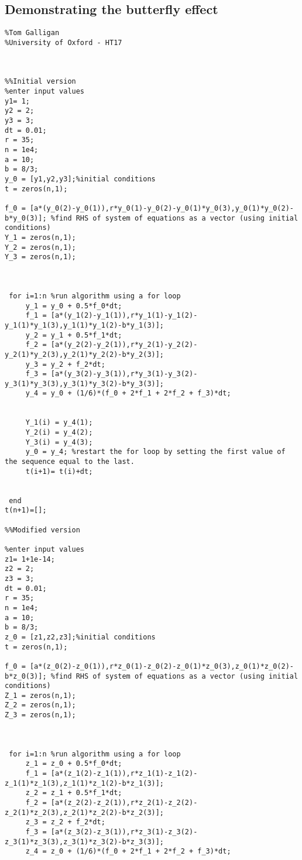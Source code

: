 \documentclass[a4paper,11pt]{article}
\begin{document}
\subsection{Demonstrating the butterfly effect}
\begin{lstlisting}[style=matlab-editor]
%CO24: Chaos - butterfly effect demo
%Tom Galligan
%University of Oxford - HT17



%%Initial version
%enter input values
y1= 1;
y2 = 2;
y3 = 3;
dt = 0.01;
r = 35;
n = 1e4;
a = 10;
b = 8/3;
y_0 = [y1,y2,y3];%initial conditions
t = zeros(n,1);

f_0 = [a*(y_0(2)-y_0(1)),r*y_0(1)-y_0(2)-y_0(1)*y_0(3),y_0(1)*y_0(2)-b*y_0(3)]; %find RHS of system of equations as a vector (using initial conditions)
Y_1 = zeros(n,1);
Y_2 = zeros(n,1);
Y_3 = zeros(n,1);



 for i=1:n %run algorithm using a for loop
     y_1 = y_0 + 0.5*f_0*dt;
     f_1 = [a*(y_1(2)-y_1(1)),r*y_1(1)-y_1(2)-y_1(1)*y_1(3),y_1(1)*y_1(2)-b*y_1(3)];
     y_2 = y_1 + 0.5*f_1*dt;
     f_2 = [a*(y_2(2)-y_2(1)),r*y_2(1)-y_2(2)-y_2(1)*y_2(3),y_2(1)*y_2(2)-b*y_2(3)];
     y_3 = y_2 + f_2*dt;
     f_3 = [a*(y_3(2)-y_3(1)),r*y_3(1)-y_3(2)-y_3(1)*y_3(3),y_3(1)*y_3(2)-b*y_3(3)];
     y_4 = y_0 + (1/6)*(f_0 + 2*f_1 + 2*f_2 + f_3)*dt;
     
     
     Y_1(i) = y_4(1);
     Y_2(i) = y_4(2);
     Y_3(i) = y_4(3);
     y_0 = y_4; %restart the for loop by setting the first value of the sequence equal to the last.
     t(i+1)= t(i)+dt;
     
   
 end
t(n+1)=[];

%%Modified version

%enter input values
z1= 1+1e-14;
z2 = 2;
z3 = 3;
dt = 0.01;
r = 35;
n = 1e4;
a = 10;
b = 8/3;
z_0 = [z1,z2,z3];%initial conditions
t = zeros(n,1);

f_0 = [a*(z_0(2)-z_0(1)),r*z_0(1)-z_0(2)-z_0(1)*z_0(3),z_0(1)*z_0(2)-b*z_0(3)]; %find RHS of system of equations as a vector (using initial conditions)
Z_1 = zeros(n,1);
Z_2 = zeros(n,1);
Z_3 = zeros(n,1);



 for i=1:n %run algorithm using a for loop
     z_1 = z_0 + 0.5*f_0*dt;
     f_1 = [a*(z_1(2)-z_1(1)),r*z_1(1)-z_1(2)-z_1(1)*z_1(3),z_1(1)*z_1(2)-b*z_1(3)];
     z_2 = z_1 + 0.5*f_1*dt;
     f_2 = [a*(z_2(2)-z_2(1)),r*z_2(1)-z_2(2)-z_2(1)*z_2(3),z_2(1)*z_2(2)-b*z_2(3)];
     z_3 = z_2 + f_2*dt;
     f_3 = [a*(z_3(2)-z_3(1)),r*z_3(1)-z_3(2)-z_3(1)*z_3(3),z_3(1)*z_3(2)-b*z_3(3)];
     z_4 = z_0 + (1/6)*(f_0 + 2*f_1 + 2*f_2 + f_3)*dt;
     

\end{lstlisting}
\end{document}
